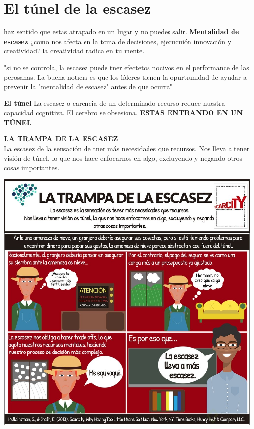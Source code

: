 \documentclass{article}
\begin{document}
\section{El túnel de la escasez}
haz sentido que estas atrapado en un lugar y no puedes salir.
\textbf{Mentalidad de escasez}
¿como nos afecta en la toma de decisiones, ejecucuión innovación y creatividad?
la creatividad radica en tu mente.
\begin{center}
    "si no se controla, la escasez puede tner efectetos nocivos en el performance de las perosanas.
    La buena noticia es que los líderes tienen la opurtiunidad de ayudar a prevenir la "mentalidad de escasez"
    antes de que ocurra"
\end{center}
\textbf{El túnel}
La escasez o carencia de un determinado recurso reduce nuestra capacidad cognitiva.
El cerebro se obsesiona. \textbf{ESTAS ENTRANDO EN UN TÚNEL}
\begin{center}
    \textbf{LA TRAMPA DE LA ESCASEZ}\\
        La escasez de la sensación de tner más necesidades que recursos.
        Nos lleva a tener visión de túnel, lo que nos hace enfocarnos en algo, excluyendo y negando
        otros cosas importantes.\\
\end{center}
\newpage
\includegraphics[scale=0.5]{imagenes/infografia-sobre-la-trampa-de-la-escasez.png}
\end{document}
